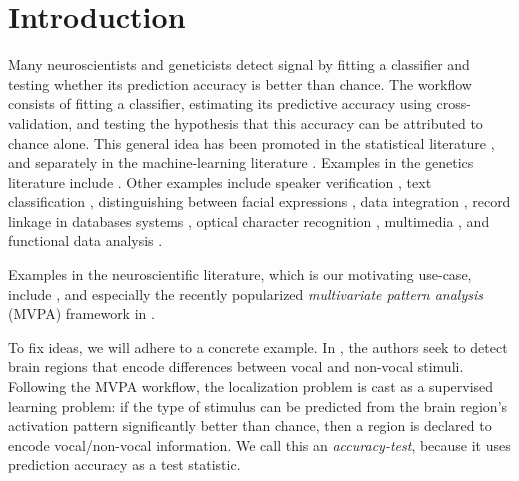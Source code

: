 \documentclass[]{bio}
\begin{document}
\section{Introduction}
\label{sec:introduction}

Many neuroscientists and geneticists detect signal by fitting a classifier and testing whether its prediction accuracy is better than chance. 
The workflow consists of fitting a classifier, estimating its predictive accuracy using cross-validation, and testing the hypothesis that this accuracy can be attributed to chance alone. 
This general idea has been promoted in the statistical literature \citep{friedman2003multivariate}, and separately in the machine-learning literature \citep{eric2008testing,ojala_permutation_2010,lopez2016revisiting}.
Examples in the genetics literature include \cite{golub_molecular_1999,slonim_class_2000,radmacher_paradigm_2002,mukherjee_estimating_2003,juan_prediction_2004,jiang_calculating_2008,yu2007two}.
Other examples include 
speaker verification \citep{gretton_kernel_2012-1}, 
text classification \citep{dhillon2003divisive,lopez2016revisiting}, 
distinguishing between facial expressions \citep{lopez2016revisiting}, 
data integration \citep{gretton_kernel_2012-1}, 
record linkage in databases systems \citep{gretton_kernel_2012-1,hall2002permutation,zhou2018statistical}, 
optical character recognition \citep{perez2009estimation}, 
multimedia \citep{moreno2004kullback}, 
and functional data analysis \citep{hall2002permutation}.

Examples in the neuroscientific literature, which is our motivating use-case, include \cite{golland_permutation_2003,pereira_machine_2009,schreiber2013statistical,olivetti2013kernel,varoquaux_assessing_2016}, and especially the recently popularized \emph{multivariate pattern analysis} (MVPA) framework in \cite{kriegeskorte_information-based_2006}.

To fix ideas, we will adhere to a concrete example.
In \cite{gilron_quantifying_2016}, the authors seek to detect brain regions that encode differences between vocal and non-vocal stimuli. 
Following the MVPA workflow, the localization problem is cast as a supervised learning problem: if the type of stimulus can be predicted from the brain region's activation pattern significantly better than chance, then a region is declared to encode vocal/non-vocal information. 
We call this an \emph{accuracy-test}, because it uses prediction accuracy as a test statistic. 
\end{document}
